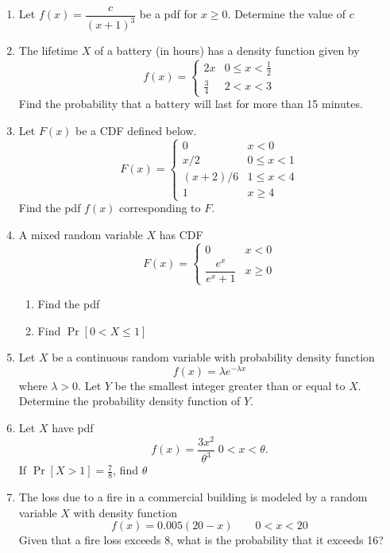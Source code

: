 \documentclass[../main.tex]{subfiles}
\begin{document}
\begin{exercises}
\begin{enumerate}
	\item Let $f(x) = \dfrac{c}{(x+1)^3}$ be a pdf for $x \geq 0$. Determine the value of $c$ %
	
	\item The lifetime $X$ of a battery (in hours)
	has a density function given by
	$$f(x) = 
	\begin{cases}
		2x & 0 \leq x < \frac12 \\
		\frac34 & 2 < x < 3 
	\end{cases}$$
	Find the probability that a battery will last for more than 15 minutes. %
	
	\item %
	Let $F(x)$ be a CDF defined below.
	$$F(x) = 
	\begin{cases}
		0	& x<0\\
		x/2 	& 0 \leq x < 1 \\
		(x+2)/6	& 1 \leq x < 4 \\
		1		& x \geq 4
	\end{cases}$$
	Find the pdf $f(x)$ corresponding to $F$.
	
	\item %
	A mixed random variable $X$ has CDF
	$$F(x) = 
	\begin{cases}
	0		& x<0\\
	\dfrac{e^x}{e^x+1}	& x \geq 0
	\end{cases}$$
	\begin{enumerate}
		\item Find the pdf
		\item Find $\Pr[0 < X \leq 1]$
	\end{enumerate}
	
	\item %
	Let $X$ be a continuous random variable with probability density function
		$$f(x) = \lambda e^{-\lambda x}$$
		where $\lambda > 0$. Let $Y$ be the smallest integer greater than or equal to $X$.
	Determine the probability density function of $Y$.
	
	\item %
	Let $X$ have pdf $$f(x) = \dfrac{3x^2}{\theta^3} \;
	0 < x < \theta.$$ If $\Pr[X>1] = \frac78$, find $\theta$
	
	\item %
	The loss due to a fire in a commercial building is modeled by a random
	variable $X$ with density function
	$$f(x) = 0.005(20-x) \qquad 0<x<20$$
	Given that a fire loss exceeds 8, what is the probability that
	it exceeds 16?
	

\end{enumerate}
\end{exercises}
\end{document}
